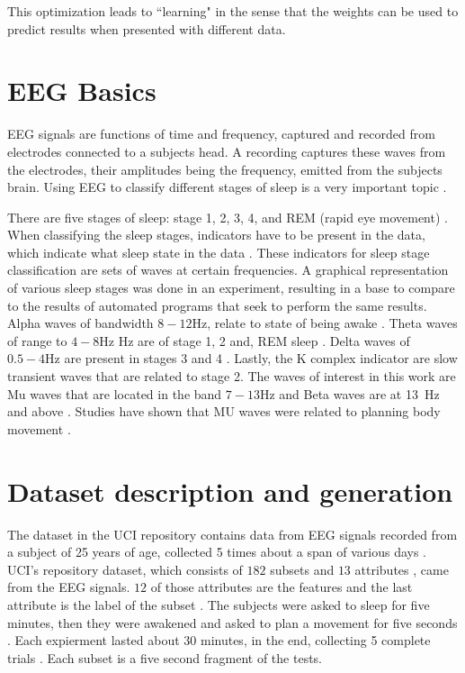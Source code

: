 \documentclass[conference,compsoc]{IEEEtran}
\begin{document}
This optimization leads to ``learning" in the sense that the weights can be used to predict results when presented with different data. 

\section{EEG Basics}
EEG signals are functions of time and frequency, captured and recorded from electrodes connected to a subjects head. A recording captures these waves from the electrodes, their amplitudes being the frequency, emitted from the subjects brain.  
Using EEG to classify different stages of sleep is a very important topic \cite{auto}.

There are five stages of sleep:  stage 1, 2, 3, 4, and REM (rapid eye movement) \cite{sleep}. When classifying the sleep stages, indicators 
have to be present in the data, which indicate what sleep state in the data \cite{auto}. These indicators for sleep stage classification are sets of waves at certain frequencies. A graphical representation of various sleep stages was done in an experiment, resulting in a base to compare to the results of automated programs that seek to perform the same results. Alpha waves of bandwidth $8-12\si{\hertz}$, relate to state of being awake \cite{auto}. Theta waves of range to $4-8\si{\hertz}$ Hz are of stage 1, 2 and, REM sleep \cite{auto}.  Delta waves of $0.5-4\si{\hertz}$ are present in stages 3 and 4 \cite{auto}. Lastly, the K complex indicator are slow transient waves that are related to stage 2.  The waves of interest in this work are Mu waves that are located in the band $7 - 13\si{\hertz}$ and Beta waves are at \SI{13}{\hertz} and above \cite{classsvm}. Studies have shown that MU waves were related to planning body movement \cite{classsvm}.

\section{Dataset description and generation}
The dataset in the UCI repository contains data from EEG signals recorded from a subject of 25 years of age, collected 5 times about a span of various days \cite{online}.  UCI's repository dataset, which consists of $182$ subsets and $13$ attributes \cite{classsvm}, came from the EEG signals. $12$ of those attributes are the features and the last attribute is the label of the subset \cite{online}. 
The subjects were asked to sleep for five minutes, then they were awakened and asked to plan a movement for five seconds \cite{classsvm}. Each expierment lasted about 30 minutes, in the end, collecting 5 complete trials \cite{online}. Each subset is a five second fragment of the tests.
\end{document}
